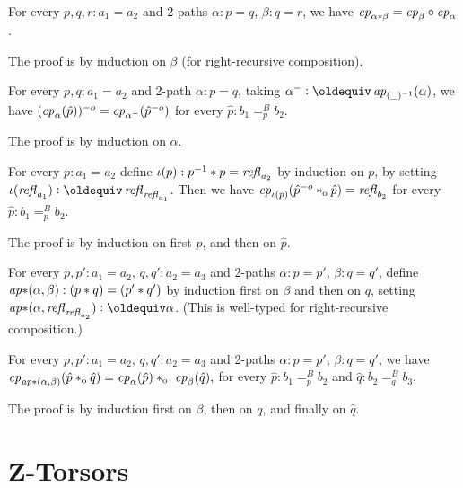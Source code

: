 \documentclass[a4,12pt]{amsart}
\begin{document}
\begin{lemma}\label{lem:functorial-change-path}
  For every $p,q,r:a_1=a_2$ and 2-paths $\alpha : p = q$, $\beta : q = r$,
  we have $\mathit{cp}_{\alpha*\beta}=\mathit{cp}_{\beta}\circ\mathit{cp}_{\alpha}$.
\end{lemma}

The proof is by induction on $\beta$ (for right-recursive composition).

\begin{lemma}\label{lem:inv2-change-path}
  For every  $p,q:a_1=a_2$ and 2-path $\alpha : p = q$, taking
  $\alpha^- \defeq \ap{(\_)^{-1}}(\alpha)$, we have
  $(\mathit{cp}_{\alpha}(\hat p))^{-o} = \mathit{cp}_{\alpha^-}(\hat p^{-o})$
  for every $\hat p: b_1=^B_p b_2$.
\end{lemma}
 The proof is by induction on $\alpha$.

\begin{lemma}\label{lem:invlaw-change-path}
  For every  $p :a_1 = a_2$ define $\iota(p): p^{-1}* p = \mathop{{\it refl}_{a_2}}$
  by induction on $p$, by setting $\iota(\refl{a_1})\defeq \refl{\refl{a_1}}$.
  Then we have $\mathit{cp}_{\iota(p)}(\hat p^{-o} *_{\mathrm{o}} {\hat p}) = \mathop{{\it refl}_{b_2}}$
  for every $\hat p: b_1=^B_p b_2$.
\end{lemma}
 The proof is by induction on first $p$, and then on $\hat p$.


\begin{definition}\label{lem:compo-ap-ap}
  For every  $p,p':a_1=a_2$, $q,q':a_2=a_3$ and 2-paths 
  $\alpha : p = p'$, $\beta : q = q'$, define
  $\mathop{{\it ap}{*}}(\alpha,\beta): (p* q)=(p'* q')$ by induction
  first on $\beta$ and then on $q$, 
  setting $\apc(\alpha,\refl{\refl{a_2}}) \defeq \alpha$.
  (This is well-typed for right-recursive composition.)
\end{definition}

\begin{lemma}\label{lem:compo-change-path}
  For every  $p,p':a_1=a_2$, $q,q':a_2=a_3$ and 2-paths 
  $\alpha : p = p'$, $\beta : q = q'$, we have
  $\cp{\apc(\alpha,\beta)}(\hat p \cto \hat q) = 
   \cp{\alpha}(\hat p) \cto  \cp{\beta}(\hat q),$
  for every $\hat p: b_1=^B_p b_2$ and $\hat q: b_2=^B_q b_3$.
\end{lemma}
 The proof is by induction first on $\beta$, then on $q$, and finally on $\hat q$.




\section{Z-Torsors}\label{sec:ZTorsors}
\end{document}
